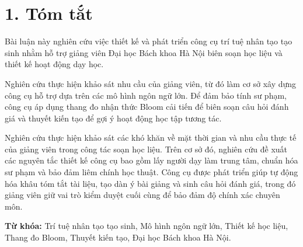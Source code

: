 \section*{1. Tóm tắt}

Bài luận này nghiên cứu việc thiết kế và phát triển công cụ trí tuệ nhân tạo tạo sinh nhằm hỗ trợ giảng viên Đại học Bách khoa Hà Nội biên soạn học liệu và thiết kế hoạt động dạy học. 

Nghiên cứu thực hiện khảo sát nhu cầu của giảng viên, từ đó làm cơ sở xây dựng công cụ hỗ trợ dựa trên các mô hình ngôn ngữ lớn. Để đảm bảo tính sư phạm, công cụ áp dụng thang đo nhận thức Bloom cải tiến để biên soạn câu hỏi đánh giá và thuyết kiến tạo để gợi ý hoạt động học tập tương tác. 

Nghiên cứu thực hiện khảo sát các khó khăn về mặt thời gian và nhu cầu thực tế của giảng viên trong công tác soạn học liệu. Trên cơ sở đó, nghiên cứu đề xuất các nguyên tắc thiết kế công cụ bao gồm lấy người dạy làm trung tâm, chuẩn hóa sư phạm và bảo đảm liêm chính học thuật. Công cụ được phát triển giúp tự động hóa khâu tóm tắt tài liệu, tạo dàn ý bài giảng và sinh câu hỏi đánh giá, trong đó giảng viên giữ vai trò kiểm duyệt cuối cùng để bảo đảm độ chính xác chuyên môn.

\vspace{0.5cm}
\noindent \textbf{Từ khóa:} Trí tuệ nhân tạo tạo sinh, Mô hình ngôn ngữ lớn, Thiết kế học liệu, Thang đo Bloom, Thuyết kiến tạo, Đại học Bách khoa Hà Nội.
